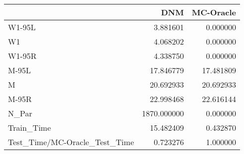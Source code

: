 \begin{tabular}{lrr}
\toprule
{} &          DNM &  MC-Oracle \\
\midrule
W1-95L                        &     3.881601 &   0.000000 \\
W1                            &     4.068202 &   0.000000 \\
W1-95R                        &     4.338750 &   0.000000 \\
M-95L                         &    17.846779 &  17.481809 \\
M                             &    20.692933 &  20.692933 \\
M-95R                         &    22.998468 &  22.616144 \\
N\_Par                         &  1870.000000 &   0.000000 \\
Train\_Time                    &    15.482409 &   0.432870 \\
Test\_Time/MC-Oracle\_Test\_Time &     0.723276 &   1.000000 \\
\bottomrule
\end{tabular}
